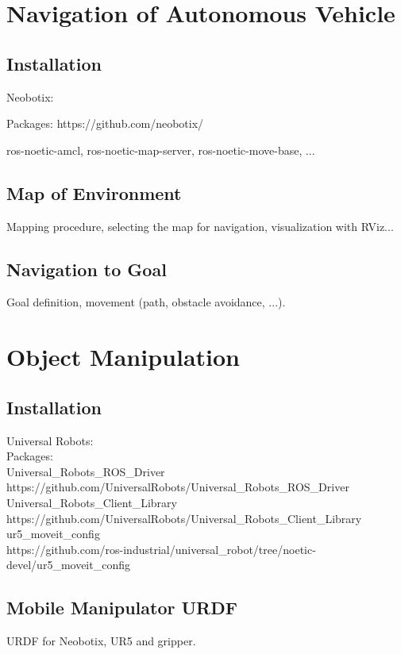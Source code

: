 \section{Navigation of Autonomous Vehicle}

\subsection{Installation}
Neobotix:

Packages:
https://github.com/neobotix/

ros-noetic-amcl, ros-noetic-map-server, ros-noetic-move-base, ...

\subsection{Map of Environment}
Mapping procedure, selecting the map for navigation, visualization with RViz...\\

\subsection{Navigation to Goal}
Goal definition, movement (path, obstacle avoidance, ...).

\section{Object Manipulation}


\subsection{Installation}
Universal Robots:\\

Packages:\\
Universal\_Robots\_ROS\_Driver
https://github.com/UniversalRobots/Universal\_Robots\_ROS\_Driver\\

Universal\_Robots\_Client\_Library\\
https://github.com/UniversalRobots/Universal\_Robots\_Client\_Library\\

ur5\_moveit\_config\\
https://github.com/ros-industrial/universal\_robot/tree/noetic-devel/ur5\_moveit\_config\\



\subsection{Mobile Manipulator URDF}
URDF for Neobotix, UR5 and gripper.\\

